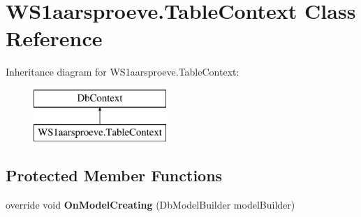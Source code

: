 \hypertarget{class_w_s1aarsproeve_1_1_table_context}{}\section{W\+S1aarsproeve.\+Table\+Context Class Reference}
\label{class_w_s1aarsproeve_1_1_table_context}
Inheritance diagram for W\+S1aarsproeve.\+Table\+Context\+:\begin{figure}[H]
\begin{center}
\leavevmode
\includegraphics[height=2.000000cm]{class_w_s1aarsproeve_1_1_table_context}
\end{center}
\end{figure}
\subsection*{Protected Member Functions}
\begin{DoxyCompactItemize}
\item 
\hypertarget{class_w_s1aarsproeve_1_1_table_context_ab4bede26a081206342f842ceebe04fcb}{}override void {\bfseries On\+Model\+Creating} (Db\+Model\+Builder model\+Builder)\label{class_w_s1aarsproeve_1_1_table_context_ab4bede26a081206342f842ceebe04fcb}

\end{DoxyCompactItemize}
